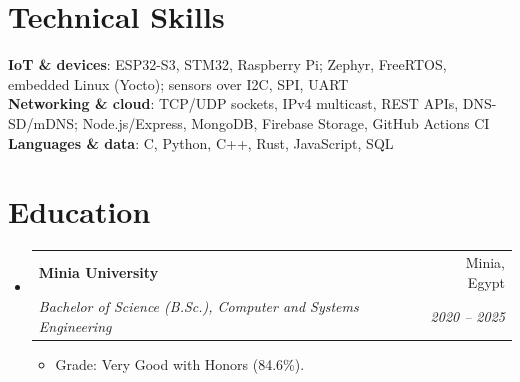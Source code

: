 \documentclass[letterpaper,11pt]{article}
\makeatletter
\newcommand{\resumeItem}[1]{
  \item\small{
    {#1 \vspace{-2pt}}
  }
}
\newcommand{\resumeSubheading}[4]{
  \vspace{-2pt}\item
    \begin{tabular*}{0.97\textwidth}[t]{l@{\extracolsep{\fill}}r}
      \textbf{#1} & #2 \\
      \textit{\small#3} & \textit{\small #4} \\
    \end{tabular*}\vspace{-7pt}
}
\newcommand{\resumeSubHeadingListStart}{\begin{itemize}[leftmargin=0.15in, label={}]}
\newcommand{\resumeSubHeadingListEnd}{\end{itemize}}
\newcommand{\resumeItemListStart}{\begin{itemize}}
\newcommand{\resumeItemListEnd}{\end{itemize}\vspace{-5pt}}
\makeatother
\begin{document}
%
\section{Technical Skills}
 \begin{itemize}[leftmargin=0.15in, label={}]
    \small{\item{
     \textbf{IoT \& devices}{: ESP32-S3, STM32, Raspberry Pi; Zephyr, FreeRTOS, embedded Linux (Yocto); sensors over I2C, SPI, UART} \\
     \textbf{Networking \& cloud}{: TCP/UDP sockets, IPv4 multicast, REST APIs, DNS-SD/mDNS; Node.js/Express, MongoDB, Firebase Storage, GitHub Actions CI} \\
     \textbf{Languages \& data}{: C, Python, C++, Rust, JavaScript, SQL}
    }}
 \end{itemize}

\section{Education}
  \resumeSubHeadingListStart
    \resumeSubheading
      {Minia University}{Minia, Egypt}
      {Bachelor of Science (B.Sc.), Computer and Systems Engineering}{2020 -- 2025}
      \resumeItemListStart
        \resumeItem{Grade: Very Good with Honors (84.6\%).}
      \resumeItemListEnd
  \resumeSubHeadingListEnd


\end{document}
